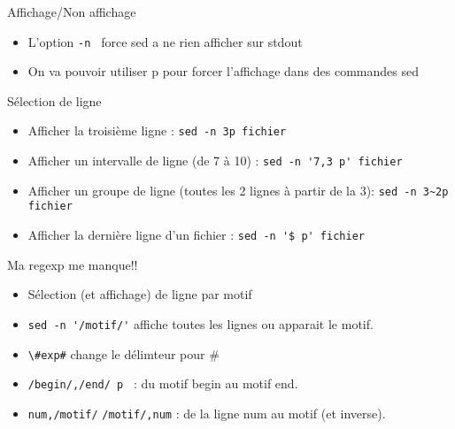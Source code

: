\begin{frame}[containsverbatim]{\ftitle}
\def\blocktitle{Affichage/Non affichage}
\begin{block}{\blocktitle}
\begin{itemize}
\item L'option \verb!-n ! force sed a ne rien afficher sur stdout
\item On va pouvoir utiliser p pour forcer l'affichage dans des commandes sed
\end{itemize}
\end{block}
\def\blocktitle{Sélection de ligne}
\begin{block}{\blocktitle}
\begin{itemize}
\item Afficher la troisième ligne : \verb!sed -n 3p fichier!
\item Afficher un intervalle de ligne (de 7 à 10) : \verb!sed -n '7,3 p' fichier!
\item Afficher un groupe de ligne (toutes les 2 lignes à partir de la 3): \verb!sed -n 3~2p fichier!
\item Afficher la dernière ligne d'un fichier : \verb!sed -n '$ p' fichier! %
\end{itemize}
\end{block}
\end{frame}


\begin{frame}[containsverbatim]{\ftitle}
\def\blocktitle{Ma regexp me manque!!}
\begin{block}{\blocktitle}
\begin{itemize}
\item Sélection (et affichage) de ligne par motif
\item \verb!sed -n '/motif/'! affiche toutes les lignes ou apparait le motif.
\item \verb!\!\verb!#exp#! change le délimteur pour \#
\item \verb!/begin/,/end/ p ! : du motif begin au motif end.
\item \verb!num,/motif/! \verb!/motif/,num! : de la ligne num au motif (et inverse).
\end{itemize}
\end{block}
\end{frame}

